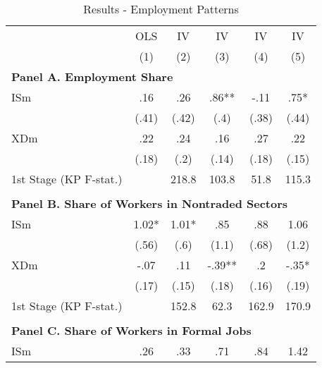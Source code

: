 \noindent \begin{center}
\begin{table}[h!]
\begin{center}
\protect\caption{\label{tab:Table_employment}Results - Employment Patterns}
\begin{centering}
\begin{tabular}{lccccc}
\hline 
 & {\footnotesize{}OLS } & {\footnotesize{}IV } & {\footnotesize{}IV } & {\footnotesize{}IV } & {\footnotesize{}IV }\tabularnewline
 & {\scriptsize{}(1)} & {\scriptsize{}(2)} & {\scriptsize{}(3)} & {\scriptsize{}(4)} & {\scriptsize{}(5)}\tabularnewline
\hline 
\multicolumn{6}{l}{\textbf{\footnotesize{}Panel A. Employment Share}}\tabularnewline
{\footnotesize{}ISm} & {\footnotesize{} .16} & {\footnotesize{} .26} & {\footnotesize{} .86**} & {\footnotesize{} -.11} & {\footnotesize{} .75*}\tabularnewline
 & {\scriptsize{}(.41)} & {\scriptsize{}(.42)} & {\scriptsize{}(.4)} & {\scriptsize{}(.38)} & {\scriptsize{}(.44)}\tabularnewline
{\footnotesize{}XDm} & {\footnotesize{} .22} & {\footnotesize{} .24} & {\footnotesize{} .16} & {\footnotesize{} .27} & {\footnotesize{} .22}\tabularnewline
 & {\scriptsize{}(.18)} & {\scriptsize{}(.2)} & {\scriptsize{}(.14)} & {\scriptsize{}(.18)} & {\scriptsize{}(.15)}\tabularnewline
{\scriptsize{}1st Stage (KP F-stat.)} &  & {\scriptsize{} 218.8} & {\scriptsize{} 103.8} & {\scriptsize{} 51.8} & {\scriptsize{} 115.3}\tabularnewline
 &  &  &  &  & \tabularnewline
\multicolumn{6}{l}{\textbf{\footnotesize{}Panel B. Share of Workers in Nontraded Sectors}}\tabularnewline
{\footnotesize{}ISm} & {\footnotesize{} 1.02*} & {\footnotesize{} 1.01*} & {\footnotesize{} .85} & {\footnotesize{} .88} & {\footnotesize{} 1.06}\tabularnewline
 & {\scriptsize{}(.56)} & {\scriptsize{}(.6)} & {\scriptsize{}(1.1)} & {\scriptsize{}(.68)} & {\scriptsize{}(1.2)}\tabularnewline
{\footnotesize{}XDm} & {\footnotesize{} -.07} & {\footnotesize{} .11} & {\footnotesize{} -.39**} & {\footnotesize{} .2} & {\footnotesize{} -.35*}\tabularnewline
 & {\scriptsize{}(.17)} & {\scriptsize{}(.15)} & {\scriptsize{}(.18)} & {\scriptsize{}(.16)} & {\scriptsize{}(.19)}\tabularnewline
{\scriptsize{}1st Stage (KP F-stat.)} &  & {\scriptsize{} 152.8} & {\scriptsize{} 62.3} & {\scriptsize{} 162.9} & {\scriptsize{} 170.9}\tabularnewline
 &  &  &  &  & \tabularnewline
\multicolumn{6}{l}{\textbf{\footnotesize{}Panel C. Share of Workers in Formal Jobs}}\tabularnewline
{\footnotesize{}ISm} & {\footnotesize{} .26} & {\footnotesize{} .33} & {\footnotesize{} .71} & {\footnotesize{} .84} & {\footnotesize{} 1.42}\tabularnewline

\end{tabular}
\end{centering}
\end{center}
\end{table}
\end{center}
